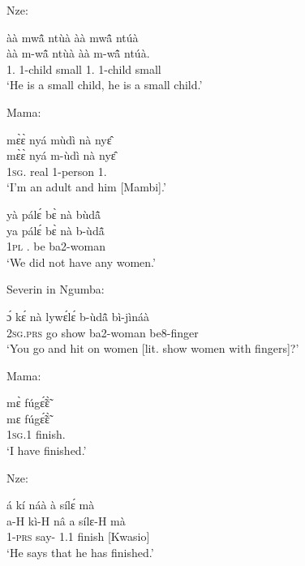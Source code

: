 \noindent Nze:

\begin{exe}[(C234)]  
\exC\label{180}
  \glll àà mwã̂ ntùà àà mwã̂ ntúà \\
       àà m-wã̂ ntùà àà m-wã̂ ntúà. \\
         1.{\COP} {\N}1-child small 1.{\COP} {\N}1-child small\\
    \trans `He is a small child, he is a small child.'
\end{exe}

\noindent Mama:

\begin{exe}[(C234)]  
\exC\label{181}
  \glll mɛ̀ɛ̀ nyá mùdì nà nyɛ̂ \\
        mɛ̀ɛ̀ nyá m-ùdì nà nyɛ̂ \\
        1\textsc{sg}.{\COP} real {\N}1-person {\CONJ} 1.{\OBJ}  \\
    \trans `I'm an adult and him [Mambi].'
 
\exC\label{182}
  \glll  yà pálɛ́ bɛ̀ nà bùdã̂ \\
      ya pálɛ́ bɛ̀ nà b-ùdã̂ \\
        1\textsc{pl} {\NEG}.{\PST}  be {\COM} ba2-woman  \\
    \trans `We did not have any women.'
\end{exe}

\noindent Severin in Ngumba:

\begin{exe}[(C234)] 
\exC\label{183} 
  \gll  ɔ́ kɛ́ nà lywɛ́lɛ́ b-ùdã̂ bì-jìnáà \\
        2\textsc{sg}.\textsc{prs} go {\CONJ} show ba2-woman be8-finger  \\
    \trans `You go and hit on women [lit. show women with fingers]?'
\end{exe}

\noindent Mama:

\begin{exe}[(C234)]  
\exC\label{184}
  \glll mɛ̀ fúgɛ̃́ɛ̃̀ \\
        mɛ fúgɛ̃́ɛ̃̀ \\
         1\textsc{sg}.{\PST}1 finish.{\COMPL} \\
    \trans `I have finished.'
\end{exe}

\noindent Nze:

\begin{exe}[(C234)]  
\exC\label{185} 
  \glll á kí náà à sílɛ́ mà \\
        a-H kì-H nâ a sílɛ-H mà \\
         1-\textsc{prs} say-{\R} {\COMP} 1.{\PST}1 finish {\COMPL}[Kwasio] \\
    \trans `He says that he has finished.'
\end{exe}

